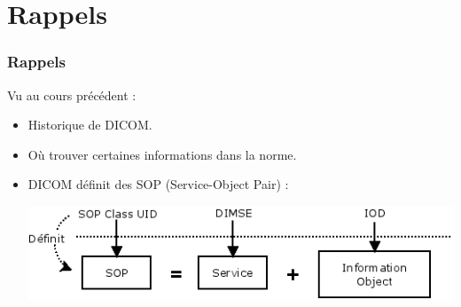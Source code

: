 \section{Rappels}

\frame
{
	\frametitle{Rappels}
	Vu au cours pr\'ec\'edent :
	\begin{itemize}
		\item Historique de DICOM.
        \item O\`{u} trouver certaines informations dans la norme.
		\item DICOM d\'efinit des SOP (Service-Object Pair) :
		\begin{center}
			\includegraphics[width=\linewidth]{./figures/sop-definition.png}
		\end{center}
	\end{itemize}
}


